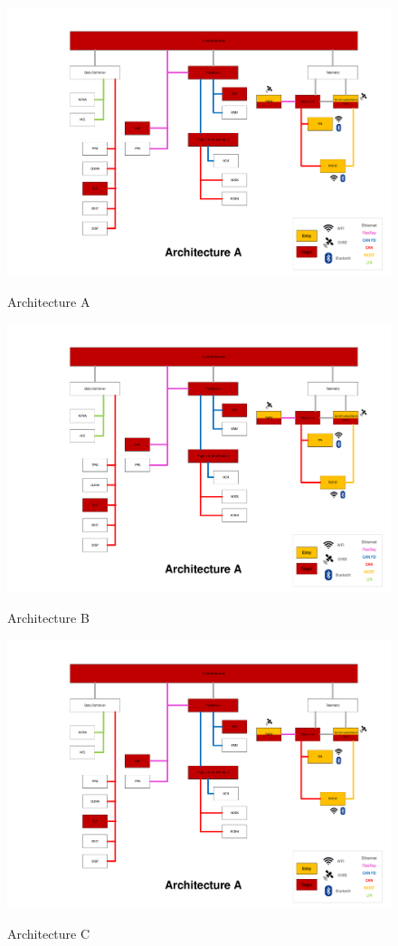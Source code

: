 \begin{figure}[h]
    \centering
    \caption{Architecture A}
    \includegraphics[width=\textwidth, page=1]{../ArchitecturesFINAL.pdf}
    \label{fig:architectureA}
\end{figure}

\begin{figure}[h]
    \centering
    \caption{Architecture B}
    \includegraphics[width=\textwidth, page=2]{../ArchitecturesFINAL.pdf}
    \label{fig:architectureB}
\end{figure}

\begin{figure}[h]
    \centering
    \caption{Architecture C}
    \includegraphics[width=\textwidth, page=3]{../ArchitecturesFINAL.pdf}
    \label{fig:architectureC}
\end{figure}
